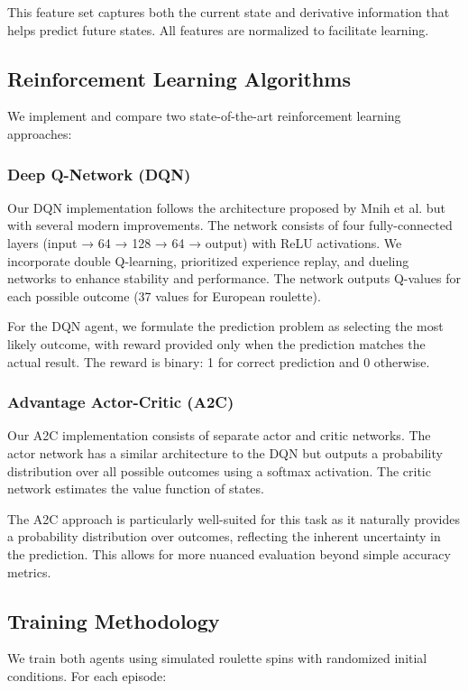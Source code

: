 \documentclass[conference]{IEEEtran}
\begin{document}
This feature set captures both the current state and derivative information that helps predict future states. All features are normalized to facilitate learning.

\subsection{Reinforcement Learning Algorithms}

We implement and compare two state-of-the-art reinforcement learning approaches:

\subsubsection{Deep Q-Network (DQN)}
Our DQN implementation follows the architecture proposed by Mnih et al. \cite{mnih2015human} but with several modern improvements. The network consists of four fully-connected layers (input → 64 → 128 → 64 → output) with ReLU activations. We incorporate double Q-learning, prioritized experience replay, and dueling networks to enhance stability and performance. The network outputs Q-values for each possible outcome (37 values for European roulette).

For the DQN agent, we formulate the prediction problem as selecting the most likely outcome, with reward provided only when the prediction matches the actual result. The reward is binary: 1 for correct prediction and 0 otherwise.

\subsubsection{Advantage Actor-Critic (A2C)}
Our A2C implementation consists of separate actor and critic networks. The actor network has a similar architecture to the DQN but outputs a probability distribution over all possible outcomes using a softmax activation. The critic network estimates the value function of states.

The A2C approach is particularly well-suited for this task as it naturally provides a probability distribution over outcomes, reflecting the inherent uncertainty in the prediction. This allows for more nuanced evaluation beyond simple accuracy metrics.

\subsection{Training Methodology}

We train both agents using simulated roulette spins with randomized initial conditions. For each episode:
\end{document}
